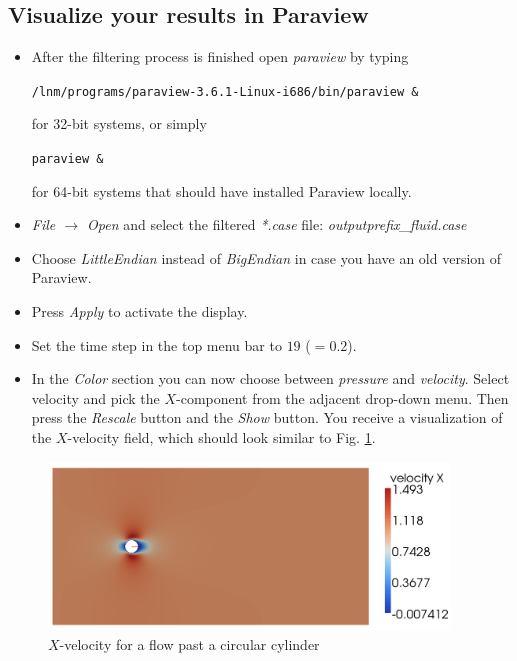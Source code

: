 \subsection{Visualize your results in Paraview}
\begin{itemize}
\item After the filtering process is finished open \emph{paraview} by typing
\begin{center}
  \texttt{/lnm/programs/paraview-3.6.1-Linux-i686/bin/paraview \&}
\end{center}
for 32-bit systems, or simply
\begin{center}
  \texttt{paraview \&}
\end{center}
for 64-bit systems that should have installed Paraview locally.

\item \emph{File $\to$ Open} and select the filtered \emph{*.case} file: \emph{outputprefix\_fluid.case}

\item Choose \emph{LittleEndian} instead of \emph{BigEndian} in case you have an old version of Paraview.

\item Press \emph{Apply} to activate the display.

\item Set the time step in the top menu bar to $19$ ($=0.2$).

\item In the \emph{Color} section you can now choose between \emph{pressure} and \emph{velocity}. Select velocity and pick the $X$-component from the adjacent drop-down menu. Then press the \emph{Rescale} button and the \emph{Show} button. You receive a visualization of the $X$-velocity field, which should look similar to Fig. \ref{fig:FlowPastCylinder_x-velocity}.
\end{itemize}

\begin{figure}[H]
 \begin{center}
  \includegraphics[width=0.95\textwidth]{pics/tut_fluid_xvel.png}
  \caption{$X$-velocity for a flow past a circular cylinder}
  \label{fig:FlowPastCylinder_x-velocity}
\end{center}
\end{figure}
